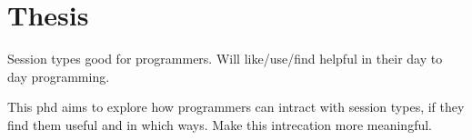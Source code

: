 \section{Thesis}




Session types good for programmers. Will like/use/find helpful in their day to day programming.

This phd aims to explore how programmers can intract with session types, if they find them useful and in which ways. Make this intrecation more meaningful. 
